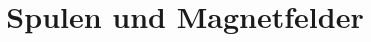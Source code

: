 

\subject{Versuch 308}
\title{Spulen und Magnetfelder}


    \maketitle
    \thispagestyle{empty}
    \tableofcontents
    \newpage
    
    
    \newpage
    
    
    
    \newpage
    \printbibliography{}

